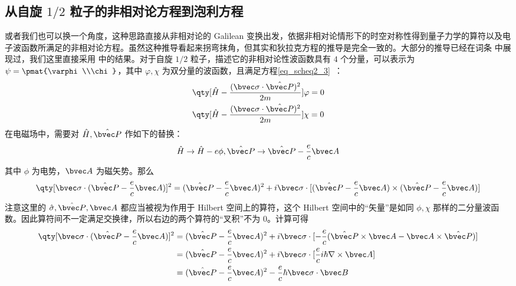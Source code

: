 \subsection{从自旋 $1/2$ 粒子的非相对论方程到泡利方程}
或者我们也可以换一个角度，这种思路直接从非相对论的 Galilean 变换出发\cite{刘觉平}，依据非相对论情形下的时空对称性得到量子力学的算符以及电子波函数所满足的非相对论方程。虽然这种推导看起来拐弯抹角，但其实和狄拉克方程的推导是完全一致的。大部分的推导已经在词条  中展现过，我们这里直接采用 中的结果。对于自旋 $1/2$ 粒子，描述它的非相对论性波函数具有 $4$ 个分量，可以表示为 $\psi=\pmat{\varphi\\\chi}$，其中 $\varphi,\chi$ 为双分量的波函数，且满足方程\autoref{eq_scheq2_3}~：
\begin{equation}
\begin{aligned}
&\qty[\hat H-\frac{(\bvec \sigma\cdot \hat{\bvec P})^2}{2m}]\varphi=0\\
&
\qty[\hat H-\frac{(\bvec \sigma\cdot \hat{\bvec P})^2}{2m}]\chi=0
\end{aligned}
\end{equation}
在电磁场中，需要对 $\hat H,\hat{\bvec P}$ 作如下的替换：
\begin{equation}
\hat H\rightarrow \hat H-e\phi, \hat{\bvec P}\rightarrow \hat{\bvec P}-\frac{e}{c}\bvec A
\end{equation}
其中 $\phi$ 为电势，$\bvec A$ 为磁矢势。那么
\begin{equation}\label{eq_Pauli_1}
\qty[\bvec \sigma\cdot(\hat{\bvec P}-\frac{e}{c}\bvec A)]^2=(\hat{\bvec P}-\frac{e}{c}\bvec A)^2+i\bvec \sigma\cdot[(\hat{\bvec P}-\frac{e}{c}\bvec A)\times (\hat{\bvec P}-\frac{e}{c}\bvec A)]
\end{equation}
注意这里的 $\hat \sigma,\hat{\bvec P},\bvec A$ 都应当被视为作用于 Hilbert 空间上的算符，这个 Hilbert 空间中的“矢量”是如同 $\phi,\chi$ 那样的二分量波函数。因此算符间不一定满足交换律，所以右边的两个算符的“叉积”不为 $0$。计算可得
\begin{equation}
\begin{aligned}
\qty[\bvec \sigma \cdot (\hat{\bvec P}-\frac{e}{c}\bvec A)]^2
&=(\hat{\bvec P}-\frac{e}{c}\bvec A)^2+i\bvec \sigma\cdot[-\frac{e}{c}(\hat{\bvec P}\times \bvec A- \bvec A\times \hat{\bvec P})]\\
&=(\hat{\bvec P}-\frac{e}{c}\bvec A)^2+i\bvec \sigma\cdot[\frac{e}{c}i\hbar \nabla \times  \bvec A]\\
&=(\hat{\bvec P}-\frac{e}{c}\bvec A)^2-\frac{e}{c}\hbar\bvec \sigma\cdot \bvec B
\end{aligned}
\end{equation}
